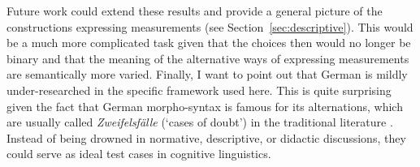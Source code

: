 Future work could extend these results and provide a general picture of the constructions expressing measurements (see Section~\ref{sec:descriptive}).
This would be a much more complicated task given that the choices then would no longer be binary and that the meaning of the alternative ways of expressing measurements are semantically more varied.
Finally, I want to point out that German is mildly under-researched in the specific framework used here.
This is quite surprising given the fact that German morpho-syntax is famous for its alternations, which are usually called \textit{Zweifelsfälle} (`cases of doubt') in the traditional literature \citep{Duden09,Klein2009}.
Instead of being drowned in normative, descriptive, or didactic discussions, they could serve as ideal test cases in cognitive linguistics.


